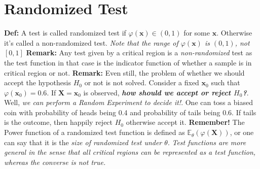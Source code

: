 \documentclass[a4paper]{article}
\begin{document}
\section{Randomized Test}
\textbf{Def:} A test is called randomized test if $\varphi \left( \mathbf{x} \right) \in \left( 0,1 \right)$ for some $\mathbf{x}$.
\newline
Otherwise it's called a non-randomized test.
\newline\newline
\textit{Note that the range of $\varphi\left( \mathbf{x}\right) $ is $\left( 0,1 \right) $, not $\left[ 0,1 \right] $}
\newline\newline
\textbf{Remark:} Any test given by a critical region is a \textit{non-randomized} test as the test function in that case is the indicator function of whether a sample is in critical region or not.
\newline\newline
\textbf{Remark:} Even still, the problem of whether we should accept the hypothesis $H_0$ or not is not solved.
Consider a fixed $\mathbf{x}_0$ such that $\varphi\left( \mathbf{x}_0 \right) = 0.6$. If $\mathbf{X} = \mathbf{x}_0$ is observed, \textbf{\textit{how should we accept or reject $H_0$?}}. Well, \textit{we can perform a Random Experiment to decide it!}. One can toss a biased coin with probability of heads being 0.4 and probability of tails being 0.6. If tails is the outcome, then happily reject $H_0$ otherwise accept it.
\newline\newline
\textbf{Remember!} The Power function of a randomized test function is defined as $\mathbb{E}_\theta \left( \varphi\left( \mathbf{X} \right)  \right) $, or one can say that it is the \textit{size of randomized test under $\theta$}.
\newline\newline
\textit{Test functions are more general in the sense that all critical regions can be represented as a test function, whereas the converse is not true.
}
\end{document}
